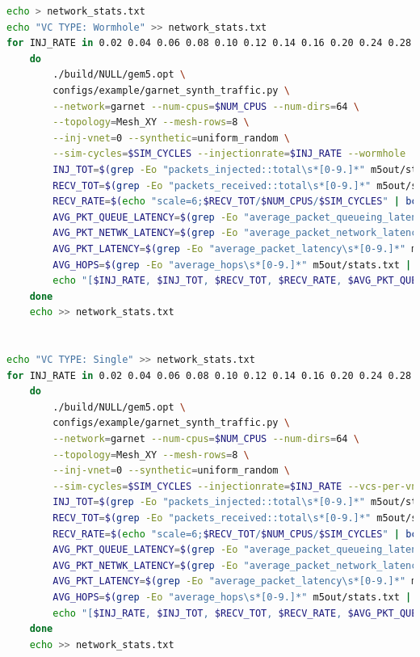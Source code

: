 \documentclass{article}
\begin{document}
\begin{lstlisting}[language=bash]
echo > network_stats.txt
echo "VC TYPE: Wormhole" >> network_stats.txt
for INJ_RATE in 0.02 0.04 0.06 0.08 0.10 0.12 0.14 0.16 0.20 0.24 0.28 0.32 0.40 0.48 0.56 0.64 0.72 0.80
	do
		./build/NULL/gem5.opt \
		configs/example/garnet_synth_traffic.py \
		--network=garnet --num-cpus=$NUM_CPUS --num-dirs=64 \
		--topology=Mesh_XY --mesh-rows=8 \
		--inj-vnet=0 --synthetic=uniform_random \
		--sim-cycles=$SIM_CYCLES --injectionrate=$INJ_RATE --wormhole
		INJ_TOT=$(grep -Eo "packets_injected::total\s*[0-9.]*" m5out/stats.txt | grep -Eo "[0-9.]*")
		RECV_TOT=$(grep -Eo "packets_received::total\s*[0-9.]*" m5out/stats.txt | grep -Eo "[0-9.]*")
		RECV_RATE=$(echo "scale=6;$RECV_TOT/$NUM_CPUS/$SIM_CYCLES" | bc)
		AVG_PKT_QUEUE_LATENCY=$(grep -Eo "average_packet_queueing_latency\s*[0-9.]*" m5out/stats.txt | grep -Eo "[0-9.]*")
		AVG_PKT_NETWK_LATENCY=$(grep -Eo "average_packet_network_latency\s*[0-9.]*" m5out/stats.txt | grep -Eo "[0-9.]*")
		AVG_PKT_LATENCY=$(grep -Eo "average_packet_latency\s*[0-9.]*" m5out/stats.txt | grep -Eo "[0-9.]*")
		AVG_HOPS=$(grep -Eo "average_hops\s*[0-9.]*" m5out/stats.txt | grep -Eo "[0-9.]*")
		echo "[$INJ_RATE, $INJ_TOT, $RECV_TOT, $RECV_RATE, $AVG_PKT_QUEUE_LATENCY, $AVG_PKT_NETWK_LATENCY, $AVG_PKT_LATENCY, $AVG_HOPS]" >> network_stats.txt
	done
	echo >> network_stats.txt


echo "VC TYPE: Single" >> network_stats.txt
for INJ_RATE in 0.02 0.04 0.06 0.08 0.10 0.12 0.14 0.16 0.20 0.24 0.28 0.32 0.40 0.48 0.56 0.64 0.72 0.80
	do
		./build/NULL/gem5.opt \
		configs/example/garnet_synth_traffic.py \
		--network=garnet --num-cpus=$NUM_CPUS --num-dirs=64 \
		--topology=Mesh_XY --mesh-rows=8 \
		--inj-vnet=0 --synthetic=uniform_random \
		--sim-cycles=$SIM_CYCLES --injectionrate=$INJ_RATE --vcs-per-vnet=1
		INJ_TOT=$(grep -Eo "packets_injected::total\s*[0-9.]*" m5out/stats.txt | grep -Eo "[0-9.]*")
		RECV_TOT=$(grep -Eo "packets_received::total\s*[0-9.]*" m5out/stats.txt | grep -Eo "[0-9.]*")
		RECV_RATE=$(echo "scale=6;$RECV_TOT/$NUM_CPUS/$SIM_CYCLES" | bc)
		AVG_PKT_QUEUE_LATENCY=$(grep -Eo "average_packet_queueing_latency\s*[0-9.]*" m5out/stats.txt | grep -Eo "[0-9.]*")
		AVG_PKT_NETWK_LATENCY=$(grep -Eo "average_packet_network_latency\s*[0-9.]*" m5out/stats.txt | grep -Eo "[0-9.]*")
		AVG_PKT_LATENCY=$(grep -Eo "average_packet_latency\s*[0-9.]*" m5out/stats.txt | grep -Eo "[0-9.]*")
		AVG_HOPS=$(grep -Eo "average_hops\s*[0-9.]*" m5out/stats.txt | grep -Eo "[0-9.]*")
		echo "[$INJ_RATE, $INJ_TOT, $RECV_TOT, $RECV_RATE, $AVG_PKT_QUEUE_LATENCY, $AVG_PKT_NETWK_LATENCY, $AVG_PKT_LATENCY, $AVG_HOPS]" >> network_stats.txt
	done
	echo >> network_stats.txt



\end{lstlisting}
\end{document}
